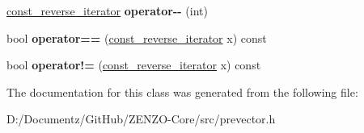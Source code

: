 \begin{DoxyCompactItemize}
\mbox{\hyperlink{classprevector_1_1const__reverse__iterator}{const\+\_\+reverse\+\_\+iterator}} {\bfseries operator-\/-\/} (int)
\item 
\mbox{\label{classprevector_1_1const__reverse__iterator_adde47c930cc199ee6432405f1f376c14}} 
bool {\bfseries operator==} (\mbox{\hyperlink{classprevector_1_1const__reverse__iterator}{const\+\_\+reverse\+\_\+iterator}} x) const
\item 
\mbox{\label{classprevector_1_1const__reverse__iterator_ad1da739c0adfa0624b3c99161ad46810}} 
bool {\bfseries operator!=} (\mbox{\hyperlink{classprevector_1_1const__reverse__iterator}{const\+\_\+reverse\+\_\+iterator}} x) const
\end{DoxyCompactItemize}


The documentation for this class was generated from the following file\+:\begin{DoxyCompactItemize}
\item 
D\+:/\+Documentz/\+Git\+Hub/\+Z\+E\+N\+Z\+O-\/\+Core/src/prevector.\+h\end{DoxyCompactItemize}
